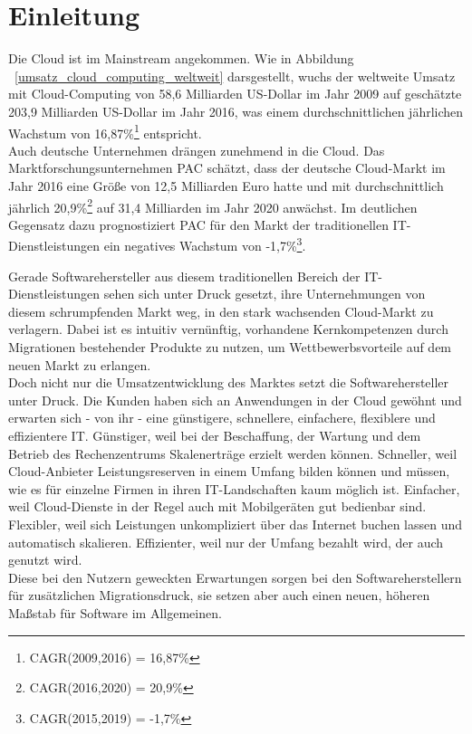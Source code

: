 \section{Einleitung}
Die Cloud ist im Mainstream angekommen.  Wie in 
Abbildung ~\ref{umsatz_cloud_computing_weltweit} darsgestellt, wuchs der 
weltweite Umsatz mit Cloud-Computing von 58,6 Milliarden US-Dollar im 
Jahr 2009 auf geschätzte 203,9 Milliarden US-Dollar im Jahr 2016, was einem 
durchschnittlichen jährlichen Wachstum von 16,87\%\footnote{CAGR(2009,2016) = 
16,87\%} entspricht.  \\
Auch deutsche Unternehmen drängen zunehmend in die Cloud. Das 
Marktforschungsunternehmen PAC schätzt, dass der 
deutsche Cloud-Markt im Jahr 2016 eine Größe von 12,5 Milliarden Euro hatte und 
mit durchschnittlich jährlich 20,9\%\footnote{CAGR(2016,2020) = 20,9\%} auf 31,4 
Milliarden im Jahr 2020 anwächst. Im deutlichen Gegensatz dazu prognostiziert 
PAC für den Markt der traditionellen IT-Dienstleistungen ein negatives Wachstum 
von  -1,7\%\footnote{CAGR(2015,2019) = -1,7\%}. 



Gerade Softwarehersteller aus diesem traditionellen Bereich der 
IT-Dienstleistungen sehen sich unter Druck gesetzt, ihre 
Unternehmungen von diesem schrumpfenden Markt weg, in den stark wachsenden 
Cloud-Markt zu verlagern. Dabei ist es intuitiv vernünftig, vorhandene 
Kernkompetenzen durch Migrationen bestehender Produkte zu nutzen, um 
Wettbewerbsvorteile auf dem neuen Markt zu erlangen. \\
Doch nicht nur die Umsatzentwicklung des Marktes setzt die Softwarehersteller 
unter Druck. Die Kunden haben sich an Anwendungen in der Cloud gewöhnt und 
erwarten sich - von ihr - eine günstigere, schnellere, einfachere, flexiblere 
und 
effizientere IT. Günstiger, weil bei der Beschaffung, der Wartung und dem 
Betrieb des Rechenzentrums Skalenerträge erzielt werden können. Schneller, weil 
Cloud-Anbieter Leistungsreserven in einem Umfang bilden können und müssen, wie 
es für einzelne Firmen in ihren IT-Landschaften kaum möglich ist. Einfacher, 
weil Cloud-Dienste in der Regel auch mit Mobilgeräten gut bedienbar sind. 
Flexibler, weil sich Leistungen unkompliziert über das Internet buchen lassen 
und automatisch skalieren. Effizienter, weil nur der Umfang bezahlt wird, 
der auch genutzt wird.  \\
Diese bei den Nutzern geweckten Erwartungen sorgen bei den Softwareherstellern 
für zusätzlichen Migrationsdruck, sie setzen aber auch einen neuen, höheren 
Maßstab für Software im Allgemeinen.


